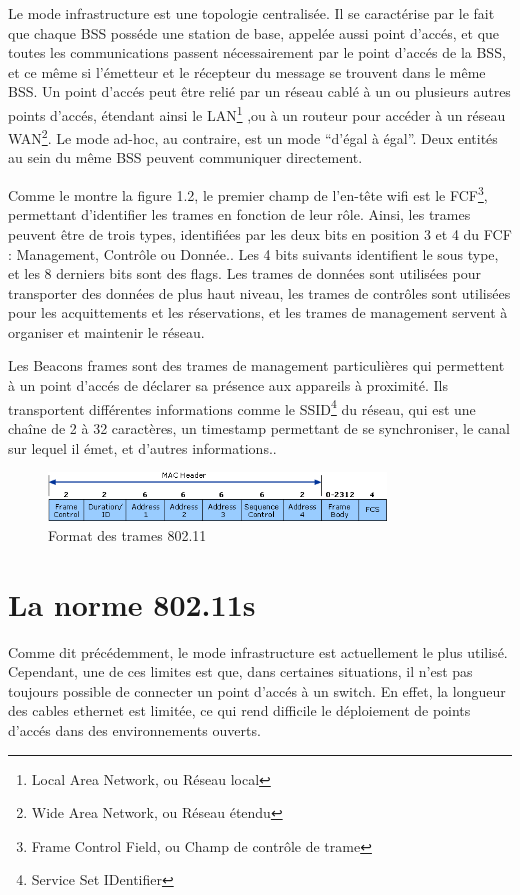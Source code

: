 Le mode infrastructure est une topologie centralisée. Il se caractérise par le fait que chaque BSS posséde une station de
base, appelée aussi point d'accés, et que toutes les communications passent nécessairement par le point d'accés de la BSS,
et ce même si l'émetteur et le récepteur du message se trouvent dans le même BSS. Un point d'accés peut être relié par un réseau
cablé à un ou plusieurs autres points d'accés, étendant ainsi le LAN\footnote{Local Area Network, ou Réseau local}
\cite{WFfunc},ou à un routeur pour accéder à un réseau WAN\footnote{Wide Area Network, ou Réseau étendu}.
Le mode ad-hoc, au contraire, est un mode ``d'égal à égal''. Deux entités au sein du même BSS peuvent communiquer directement.


Comme le montre la figure 1.2\cite{WFhead}, le premier champ de l'en-tête wifi est le FCF\footnote{Frame Control Field, ou Champ
de contrôle de trame}, permettant d'identifier les trames en fonction de leur rôle. Ainsi, les trames peuvent être de trois types,
identifiées par les deux bits en position 3 et 4 du FCF : Management, Contrôle ou Donnée.\cite{WFfcf}. Les 4 bits suivants
identifient le sous type, et les 8 derniers bits sont des flags. Les trames de données sont utilisées pour transporter des données
de plus haut niveau, les trames de contrôles sont utilisées pour les acquittements et les réservations, et les trames de management
servent à organiser et maintenir le réseau\cite{MNfunc}.

Les Beacons frames sont des trames de management particulières qui permettent à un point d'accés de déclarer sa présence aux
appareils à proximité. Ils transportent différentes informations comme le SSID\footnote{Service Set IDentifier} du réseau,
qui est une chaîne de 2 à 32 caractères, un timestamp permettant de se synchroniser, le canal sur lequel il émet, 
et d'autres informations.\cite{WFfunc2}.
\begin{figure}
   \centering
   \includegraphics[width=0.8\textwidth,natwidth=488,natheight=513]{images/header_wifi.png}
   \caption{Format des trames 802.11}
\end{figure}

\section{La norme 802.11s}
Comme dit précédemment, le mode infrastructure est actuellement le plus utilisé. Cependant, une de ces limites est
que, dans certaines situations, il n'est pas toujours possible de connecter un point d'accés à un switch\cite{MNintro}.
En effet, la longueur des cables ethernet est limitée, ce qui rend difficile le déploiement de points d'accés dans des
environnements ouverts.

